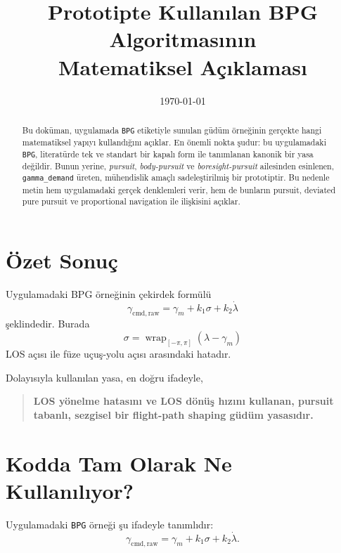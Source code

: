 \documentclass[11pt,a4paper]{article}
\title{Prototipte Kullanılan BPG Algoritmasının\\Matematiksel Açıklaması}
\author{}
\date{\today}
\begin{document}
\maketitle

\begin{abstract}
Bu doküman, uygulamada \texttt{BPG} etiketiyle sunulan güdüm örneğinin gerçekte hangi matematiksel yapıyı kullandığını açıklar. En önemli nokta şudur: bu uygulamadaki \texttt{BPG}, literatürde tek ve standart bir kapalı form ile tanımlanan kanonik bir yasa değildir. Bunun yerine, \emph{pursuit}, \emph{body-pursuit} ve \emph{boresight-pursuit} ailesinden esinlenen, \texttt{gamma\_demand} üreten, mühendislik amaçlı sadeleştirilmiş bir prototiptir. Bu nedenle metin hem uygulamadaki gerçek denklemleri verir, hem de bunların pursuit, deviated pure pursuit ve proportional navigation ile ilişkisini açıklar.
\end{abstract}

\section{Özet Sonuç}

Uygulamadaki BPG örneğinin çekirdek formülü
\begin{equation}
\gamma_{\mathrm{cmd,raw}}
=
\gamma_m + k_1 \sigma + k_2 \dot{\lambda}
\label{eq:bpg_raw}
\end{equation}
şeklindedir. Burada
\begin{equation}
\sigma = \operatorname{wrap}_{[-\pi,\pi]}\!\left(\lambda - \gamma_m\right)
\label{eq:sigma_def}
\end{equation}
LOS açısı ile füze uçuş-yolu açısı arasındaki hatadır.

Dolayısıyla kullanılan yasa, en doğru ifadeyle,
\begin{quote}
\textbf{LOS yönelme hatasını ve LOS dönüş hızını kullanan, pursuit tabanlı, sezgisel bir flight-path shaping güdüm yasasıdır.}
\end{quote}

\section{Kodda Tam Olarak Ne Kullanılıyor?}

Uygulamadaki \texttt{BPG} örneği şu ifadeyle tanımlıdır:
\begin{equation}
\gamma_{\mathrm{cmd,raw}} = \gamma_m + k_1 \sigma + k_2 \dot{\lambda}.
\end{equation}
\end{document}

